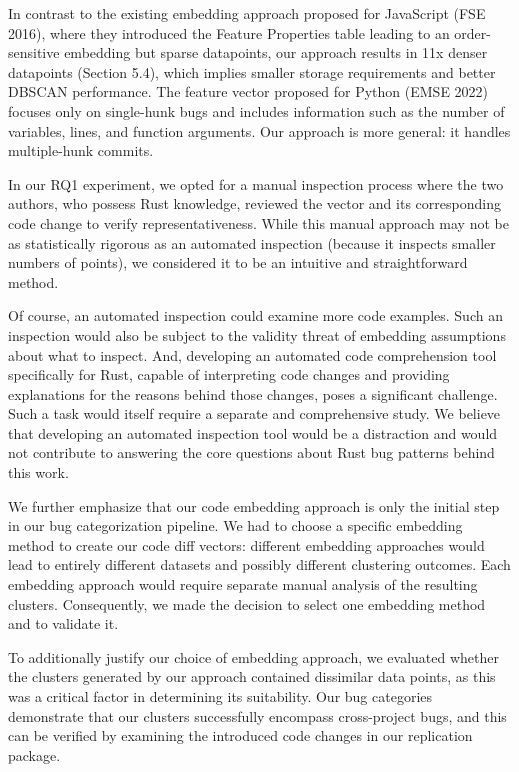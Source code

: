 \documentclass{article}
\begin{document}
In contrast to the existing embedding approach proposed for JavaScript (FSE 2016), where they introduced the Feature Properties table leading to an order-sensitive embedding but sparse datapoints, our approach results in 11x denser datapoints (Section 5.4), which implies smaller storage requirements and better DBSCAN performance. The feature vector proposed for Python (EMSE 2022) focuses only on single-hunk bugs and includes information such as the number of variables, lines, and function arguments. Our approach is more general: it handles multiple-hunk commits.

In our RQ1 experiment, we opted for a manual inspection process where the two authors, who possess Rust knowledge, reviewed the vector and its corresponding code change to verify representativeness. While this manual approach may not be as statistically rigorous as an automated inspection (because it inspects smaller numbers of points), we considered it to be an intuitive and straightforward method.

Of course, an automated inspection could examine more code examples. Such an inspection would also be subject to the validity threat of embedding assumptions about what to inspect. And, developing an automated code comprehension tool specifically for Rust, capable of interpreting code changes and providing explanations for the reasons behind those changes, poses a significant challenge. Such a task would itself require a separate and comprehensive study. We believe that developing an automated inspection tool would be a distraction and would not contribute to answering the core questions about Rust bug patterns behind this work.

We further emphasize that our code embedding approach is only the initial step in our bug categorization pipeline. We had to choose a specific embedding method to create our code diff vectors: different embedding approaches would lead to entirely different datasets and possibly different clustering outcomes. Each embedding approach would require separate manual analysis of the resulting clusters. Consequently, we made the decision to select one embedding method and to validate it.

To additionally justify our choice of embedding approach, we evaluated whether the clusters generated by our approach contained dissimilar data points, as this was a critical factor in determining its suitability. Our bug categories demonstrate that our clusters successfully encompass cross-project bugs, and this can be verified by examining the introduced code changes in our replication package. \\ \\
\end{document}
